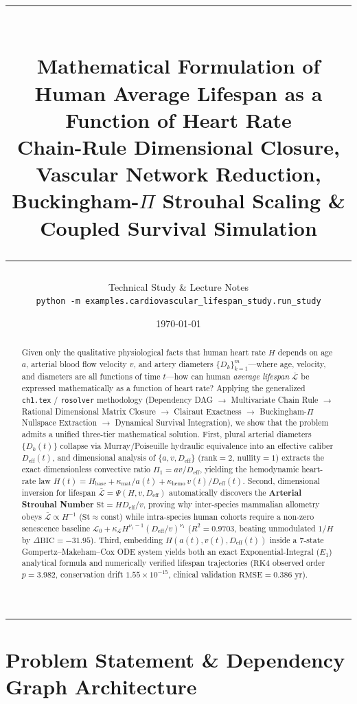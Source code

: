 \documentclass[11pt,a4paper]{article}
\title{
  {\color{navy}\rule{\textwidth}{1.8pt}}\\[0.6em]
  {\LARGE\bfseries\color{navy} Mathematical Formulation of Human Average Lifespan as a Function of Heart Rate}\\[0.35em]
  {\large\color{slate} Chain-Rule Dimensional Closure, Vascular Network Reduction, Buckingham-$\Pi$ Strouhal Scaling \& Coupled Survival Simulation}\\[0.4em]
  {\color{navy}\rule{\textwidth}{0.8pt}}
}
\author{Technical Study \& Lecture Notes\\[2pt]{\small\texttt{python -m examples.cardiovascular\_lifespan\_study.run\_study}}}
\date{\today}
\newcommand{\Lbar}{\bar{\mathcal{L}}}
\newcommand{\Deff}{D_{\mathrm{eff}}}
\newcommand{\St}{\mathrm{St}}
\begin{document}
\maketitle

\begin{abstract}
\noindent Given only the qualitative physiological facts that human heart rate $H$ depends on age $a$, arterial blood flow velocity $v$, and artery diameters $\{D_k\}_{k=1}^m$—where age, velocity, and diameters are all functions of time $t$—how can human \emph{average lifespan} $\Lbar$ be expressed mathematically as a function of heart rate? Applying the generalized \texttt{ch1.tex} / \texttt{rosolver} methodology (Dependency DAG $\to$ Multivariate Chain Rule $\to$ Rational Dimensional Matrix Closure $\to$ Clairaut Exactness $\to$ Buckingham-$\Pi$ Nullspace Extraction $\to$ Dynamical Survival Integration), we show that the problem admits a unified three-tier mathematical solution. First, plural arterial diameters $\{D_k(t)\}$ collapse via Murray/Poiseuille hydraulic equivalence into an effective caliber $\Deff(t)$, and dimensional analysis of $\{a, v, \Deff\}$ ($\mathrm{rank}=2$, $\mathrm{nullity}=1$) extracts the exact dimensionless convective ratio $\Pi_1 = a v / \Deff$, yielding the hemodynamic heart-rate law $H(t) = H_{\mathrm{base}} + \kappa_{\mathrm{mat}}/a(t) + \kappa_{\mathrm{hemo}}\,v(t)/\Deff(t)$. Second, dimensional inversion for lifespan $\Lbar = \Psi(H, v, \Deff)$ automatically discovers the \textbf{Arterial Strouhal Number} $\St = H\Deff/v$, proving why inter-species mammalian allometry obeys $\Lbar \propto H^{-1}$ ($\St \approx \text{const}$) while intra-species human cohorts require a non-zero senescence baseline $\mathcal{L}_0 + \kappa_{\mathcal{L}} H^{\nu_1 - 1}(\Deff/v)^{\nu_1}$ ($R^2 = 0.9703$, beating unmodulated $1/H$ by $\Delta\mathrm{BIC} = -31.95$). Third, embedding $H(a(t),v(t),\Deff(t))$ inside a 7-state Gompertz--Makeham--Cox ODE system yields both an exact Exponential-Integral ($E_1$) analytical formula and numerically verified lifespan trajectories ($\mathrm{RK4}$ observed order $p = 3.982$, conservation drift $1.55\times 10^{-15}$, clinical validation $\mathrm{RMSE} = 0.386\text{ yr}$).
\end{abstract}

\tableofcontents
\vspace{0.8em}
\hrule
\vspace{1em}

\section{Problem Statement \& Dependency Graph Architecture}
\end{document}
